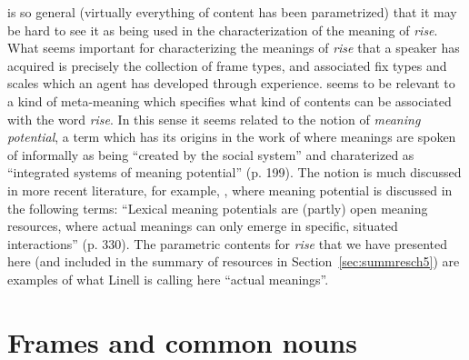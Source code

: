 \preveg{} is so general (virtually everything of content has been
parametrized) that it may be hard to see it as being used in the
characterization of the meaning of \textit{rise}.  What seems
important for characterizing the meanings of \textit{rise} that a
speaker has acquired is precisely the collection of frame types, and
associated fix types and scales which an agent has developed through
experience.  \preveg{} seems to be relevant to a kind of meta-meaning
which specifies what kind of contents can be associated with the word
\textit{rise}.  In this sense it seems related to the notion of
\textit{meaning potential}, a term which has its origins in the work
of \cite{Halliday1977} where meanings are spoken of informally as
being ``created by the social system'' and charaterized as
``integrated systems of meaning potential'' (p. 199).  The notion is much
discussed in more recent literature, for example, \cite{Linell2009}, 
where meaning potential is discussed in the following terms: ``Lexical
meaning potentials are (partly) open meaning resources, where actual
meanings can only emerge in specific, situated interactions''
(p. 330).  The parametric contents for \textit{rise} that we have
presented here (and included in the summary of resources in
Section~\ref{sec:summresch5}) are examples of what Linell is calling here ``actual meanings''.

\section{Frames and common nouns}
\label{sec:compsemPartee}

